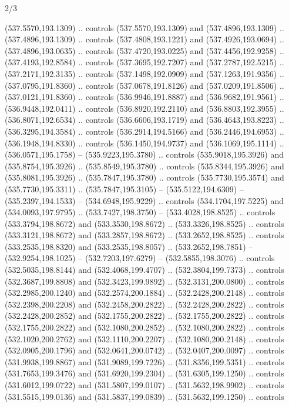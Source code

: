 \begin{flagdescription}{2/3}
\begin{scope}[xshift=0.5\flaglength,yshift=0.5\flagwidth,scale=\flagwidth/495.65]
\begin{scope}[y=0.8pt, x=0.8pt, yscale=-1,shift={(-463.76,-309.78)}]
  (537.5570,193.1309) .. controls (537.5570,193.1309) and (537.4896,193.1309) ..
  (537.4896,193.1309) .. controls (537.4808,193.1221) and (537.4926,193.0694) ..
  (537.4896,193.0635) .. controls (537.4720,193.0225) and (537.4456,192.9258) ..
  (537.4193,192.8584) .. controls (537.3695,192.7207) and (537.2787,192.5215) ..
  (537.2171,192.3135) .. controls (537.1498,192.0909) and (537.1263,191.9356) ..
  (537.0795,191.8360) .. controls (537.0678,191.8126) and (537.0209,191.8506) ..
  (537.0121,191.8360) .. controls (536.9946,191.8887) and (536.9682,191.9561) ..
  (536.9448,192.0411) .. controls (536.8920,192.2110) and (536.8803,192.3955) ..
  (536.8071,192.6534) .. controls (536.6606,193.1719) and (536.4643,193.8223) ..
  (536.3295,194.3584) .. controls (536.2914,194.5166) and (536.2446,194.6953) ..
  (536.1948,194.8330) .. controls (536.1450,194.9737) and (536.1069,195.1114) ..
  (536.0571,195.1758) -- (535.9223,195.3780) .. controls (535.9018,195.3926) and
  (535.8754,195.3926) .. (535.8549,195.3780) .. controls (535.8344,195.3926) and
  (535.8081,195.3926) .. (535.7847,195.3780) .. controls (535.7730,195.3574) and
  (535.7730,195.3311) .. (535.7847,195.3105) -- (535.5122,194.6309) --
  (535.2397,194.1533) -- (534.6948,195.9229) .. controls (534.1704,197.5225) and
  (534.0093,197.9795) .. (533.7427,198.3750) -- (533.4028,198.8525) .. controls
  (533.3794,198.8672) and (533.3530,198.8672) .. (533.3326,198.8525) .. controls
  (533.3121,198.8672) and (533.2857,198.8672) .. (533.2652,198.8525) .. controls
  (533.2535,198.8320) and (533.2535,198.8057) .. (533.2652,198.7851) --
  (532.9254,198.1025) -- (532.7203,197.6279) -- (532.5855,198.3076) .. controls
  (532.5035,198.8144) and (532.4068,199.4707) .. (532.3804,199.7373) .. controls
  (532.3687,199.8808) and (532.3423,199.9892) .. (532.3131,200.0800) .. controls
  (532.2985,200.1240) and (532.2574,200.1884) .. (532.2428,200.2148) .. controls
  (532.2398,200.2208) and (532.2458,200.2822) .. (532.2428,200.2822) .. controls
  (532.2428,200.2852) and (532.1755,200.2822) .. (532.1755,200.2822) .. controls
  (532.1755,200.2822) and (532.1080,200.2852) .. (532.1080,200.2822) .. controls
  (532.1020,200.2762) and (532.1110,200.2207) .. (532.1080,200.2148) .. controls
  (532.0905,200.1796) and (532.0641,200.0742) .. (532.0407,200.0097) .. controls
  (531.9938,199.8867) and (531.9089,199.7226) .. (531.8356,199.5351) .. controls
  (531.7653,199.3476) and (531.6920,199.2304) .. (531.6305,199.1250) .. controls
  (531.6012,199.0722) and (531.5807,199.0107) .. (531.5632,198.9902) .. controls
  (531.5515,199.0136) and (531.5837,199.0839) .. (531.5632,199.1250) .. controls

\end{scope}
\end{scope}
\end{flagdescription}
